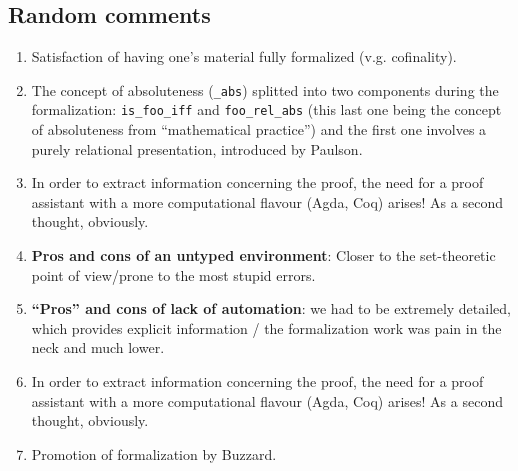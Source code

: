 \subsection{Random comments}

\begin{enumerate}
\item Satisfaction of having one's material fully formalized
  (v.g. cofinality).
\item The concept of absoluteness (\verb|_abs|) splitted into two components
  during the formalization: \verb|is_foo_iff| and \verb|foo_rel_abs| (this last one
  being the concept of absoluteness from  “mathematical practice”) and
  the first one involves a purely relational presentation, introduced
  by Paulson.
\item
  In order to extract information concerning the proof, the need for a
  proof assistant with a more computational flavour (Agda, Coq)
  arises! As a second thought, obviously.
\item  \textbf{Pros and cons of an untyped environment}: Closer to the
  set-theoretic point of view/prone to the most stupid errors.
\item \textbf{“Pros” and cons of lack of automation}: we had to be extremely
  detailed, which provides explicit information / the formalization
  work was pain in the neck and much lower.
\item In order to extract information concerning the proof, the need for a
  proof assistant with a more computational flavour (Agda, Coq)
  arises! As a second thought, obviously.
\item Promotion of formalization by Buzzard.
\end{enumerate}

